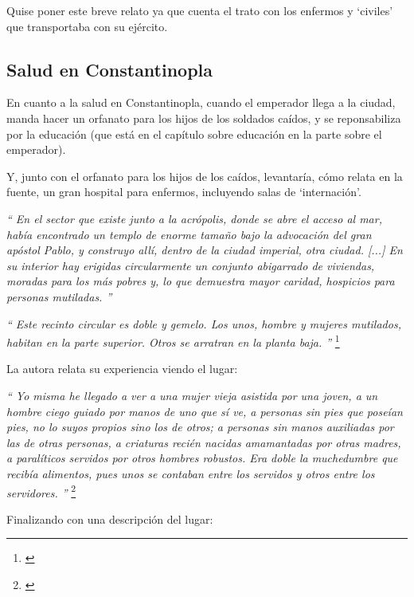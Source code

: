 Quise poner este breve relato ya que cuenta el trato con los enfermos
y `civiles' que transportaba con su ejército.

\subsection{Salud en Constantinopla}

En cuanto a la salud en Constantinopla, cuando el emperador llega
a la ciudad, manda hacer un orfanato para los hijos de los soldados
caídos, y se reponsabiliza por la educación (que está en el capítulo
sobre educación en la parte sobre el emperador).

Y, junto con el orfanato para los hijos de los caídos, levantaría,
cómo relata en la fuente, un gran hospital para enfermos, incluyendo
salas de `internación'.

\textit{``
	En el sector que existe junto a la acrópolis, donde se abre
	el acceso al mar, había encontrado un templo de enorme tamaño
	bajo la advocación del gran apóstol Pablo, y construyo allí,
	dentro de la ciudad imperial, otra ciudad. [...] En su interior
	hay erigidas circularmente un conjunto abigarrado de viviendas,
	moradas para los más pobres y, lo que demuestra mayor caridad,
	hospicios para personas mutiladas.
	''}

\textit{``
	Este recinto circular es doble y gemelo. Los unos, hombre y
	mujeres mutilados, habitan en la parte superior. Otros se arratran
	en la planta baja.
	''}
\footnote{\cite[p.~606]{alexiadaXV}}

La autora relata su experiencia viendo el lugar:

\textit{``
	Yo misma he llegado a ver a una mujer vieja asistida por una
	joven, a un hombre ciego guiado por manos de uno que sí ve,
	a personas sin pies que poseían pies, no lo suyos propios
	sino los de otros; a personas sin manos auxiliadas por las de
	otras personas, a criaturas recién nacidas amamantadas por otras
	madres, a paralíticos servidos por otros hombres robustos.
	Era doble la muchedumbre que recibía alimentos, pues unos se
	contaban entre los servidos y otros entre los servidores.
	''}
\footnote{\cite[p.~607]{alexiadaXV}}

Finalizando con una descripción del lugar:

